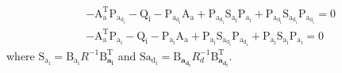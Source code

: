 \documentclass[peerreview]{IEEEtran}
\begin{document}
\begin{align}\label{coupled_riccatti_LQIDG}
	&-\boldsymbol{\mathrm{A^\mathrm{T}_a}}\boldsymbol{\mathrm{P_{a_{d_i}}}}
	 - \boldsymbol{\mathrm{Q_{i}}} - \boldsymbol{\mathrm{P_{a_{d_i}}}}\boldsymbol{\mathrm{A_a}} 
	 + \boldsymbol{\mathrm{P_{a_{d_i}}}}\boldsymbol{\mathrm{S_{a_i}}}\boldsymbol{\mathrm{P_{a_i}}}
	  +\boldsymbol{\mathrm{P_{a_{d_i}}}}\boldsymbol{\mathrm{S_{a_{d_i}}}}\boldsymbol{\mathrm{P_{a_{d_i}}}}
	=\boldsymbol{\mathrm{0}}\\
            &-\boldsymbol{\mathrm{A^\mathrm{T}_a}}\boldsymbol{\mathrm{P_{a_i}}} - \boldsymbol{\mathrm{Q_i}}
			 - \boldsymbol{\mathrm{P_{a_i}}}\boldsymbol{\mathrm{A_a}}  +
			  \boldsymbol{\mathrm{P_{a_i}}}\boldsymbol{\mathrm{S_{a_{d_i}}}}\boldsymbol{\mathrm{P_{a_{d_i}}}} 
			  +\boldsymbol{\mathrm{P_{a_i}}}\boldsymbol{\mathrm{S_{a_i}}}\boldsymbol{\mathrm{P_{a_i}}} =\boldsymbol{\mathrm{0}}
\end{align}
where $
	\boldsymbol{\mathrm{S_{a_i}}} = \boldsymbol{\mathrm{B_{a_i}}}R^{-1}\boldsymbol{\mathrm{B}^\mathrm{T}_{a_i}}$ and $
	\boldsymbol{\mathrm{S{a_{d_i}}}} = \boldsymbol{\mathrm{B}_{a_{d_i}}}R_{d}^{-1}\boldsymbol{\mathrm{B}^\mathrm{T}_{a_{d_i}}}.
$%
\end{document}
